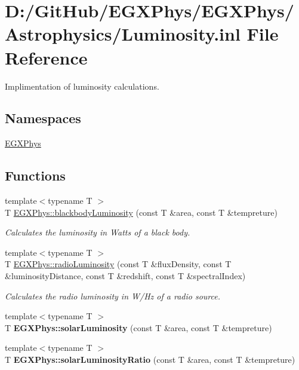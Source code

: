 \hypertarget{_luminosity_8inl}{}\section{D\+:/\+Git\+Hub/\+E\+G\+X\+Phys/\+E\+G\+X\+Phys/\+Astrophysics/\+Luminosity.inl File Reference}
\label{_luminosity_8inl}


Implimentation of luminosity calculations.  


\subsection*{Namespaces}
\begin{DoxyCompactItemize}
\item 
 \mbox{\hyperlink{namespace_e_g_x_phys}{E\+G\+X\+Phys}}
\end{DoxyCompactItemize}
\subsection*{Functions}
\begin{DoxyCompactItemize}
\item 
{\footnotesize template$<$typename T $>$ }\\T \mbox{\hyperlink{group___e_g_x_phys-_luminosity_ga909f82edfaed449b44e94788b642ebb8}{E\+G\+X\+Phys\+::blackbody\+Luminosity}} (const T \&area, const T \&tempreture)
\begin{DoxyCompactList}\small\item\em Calculates the luminosity in Watts of a black body. \end{DoxyCompactList}\item 
{\footnotesize template$<$typename T $>$ }\\T \mbox{\hyperlink{group___e_g_x_phys-_luminosity_ga6d6865b2aac1bc7c7f06b7c4ac2444e4}{E\+G\+X\+Phys\+::radio\+Luminosity}} (const T \&flux\+Density, const T \&luminosity\+Distance, const T \&redshift, const T \&spectral\+Index)
\begin{DoxyCompactList}\small\item\em Calculates the radio luminosity in W/\+Hz of a radio source. \end{DoxyCompactList}\item 
\mbox{\label{namespace_e_g_x_phys_ade3d05c9dcd810cb5290375d11587b6a}} 
{\footnotesize template$<$typename T $>$ }\\T {\bfseries E\+G\+X\+Phys\+::solar\+Luminosity} (const T \&area, const T \&tempreture)
\item 
\mbox{\label{namespace_e_g_x_phys_ac5e66686d7910587e3636b7984d466e9}} 
{\footnotesize template$<$typename T $>$ }\\T {\bfseries E\+G\+X\+Phys\+::solar\+Luminosity\+Ratio} (const T \&area, const T \&tempreture)
\end{DoxyCompactItemize}


